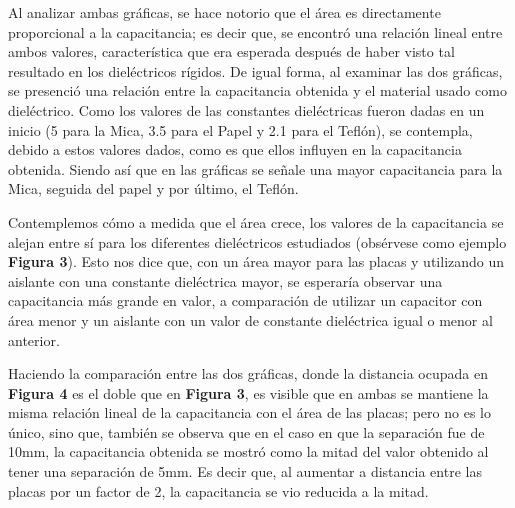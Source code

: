 \documentclass[letterpaper, 11 pt]{article}
\begin{document}
\begin{multicols}{2}
Al analizar ambas gráficas, se hace notorio que el área es directamente proporcional a la capacitancia; es decir que, se encontró una relación lineal entre ambos valores, característica que era esperada después de haber visto tal resultado en los dieléctricos rígidos. De igual forma, al examinar las dos gráficas, se presenció una relación entre la capacitancia obtenida y el material usado como dieléctrico. Como los valores de las constantes dieléctricas fueron dadas en un inicio (5 para la Mica, 3.5 para el Papel y 2.1 para el Teflón), se contempla, debido a estos valores dados, como es que ellos influyen en la capacitancia obtenida. Siendo así que en las gráficas se señale una mayor capacitancia para la Mica, seguida del papel y por último, el Teflón.

Contemplemos cómo a medida que el área crece, los valores de la capacitancia se alejan entre sí para los diferentes dieléctricos estudiados (obsérvese como ejemplo \textbf{Figura 3}). Esto nos dice que, con un área mayor para las placas y utilizando un aislante con una constante dieléctrica mayor, se  esperaría observar una capacitancia más grande en valor, a comparación de utilizar un capacitor con área menor y un aislante con un valor de constante dieléctrica igual o menor al anterior.


Haciendo la comparación entre las dos gráficas, donde la distancia ocupada en \textbf{Figura 4} es el doble que en \textbf{Figura 3}, es visible que en ambas se mantiene la misma relación lineal de la capacitancia con el área de las placas; pero no es lo único, sino que, también se observa que en el caso en que la separación fue de 10mm, la capacitancia obtenida se mostró como la mitad del valor obtenido al tener una separación de 5mm. Es decir que, al aumentar a distancia entre las placas por un factor de 2, la capacitancia se vio reducida a la mitad.



\end{multicols}
\end{document}
